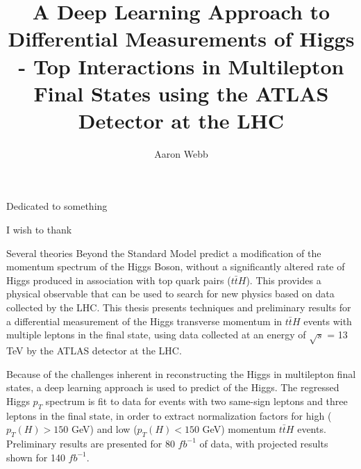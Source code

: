 \documentclass[12pt]{report}	%
\author{Aaron Webb}  	%
\title{A Deep Learning Approach to Differential Measurements of Higgs - Top Interactions in Multilepton Final States using the ATLAS Detector at the LHC}
\theoremstyle{definition}
\theoremstyle{remark}
\begin{document}
\copyrightpage          %


%
%
%
\commcertpage           %

\titlepage              %



%
\begin{dedication}
%
Dedicated to something 
\end{dedication}


\begin{acknowledgments}		%
%
I wish to thank 
\end{acknowledgments}


%
\utabstract
{}%
\indent

\par Several theories Beyond the Standard Model predict a modification of the momentum spectrum of the Higgs Boson, without a significantly altered rate of Higgs produced in association with top quark pairs ($t\bar{t}H$). This provides a physical observable that can be used to search for new physics based on data collected by the LHC. This thesis presents techniques and preliminary results for a differential measurement of the Higgs transverse momentum in $t\bar{t}H$ events with multiple leptons in the final state, using data collected at an energy of $\sqrt{s}$ = 13 TeV by the ATLAS detector at the LHC.

\par Because of the challenges inherent in reconstructing the Higgs in multilepton final states, a deep learning approach is used to predict of the Higgs. The regressed Higgs $p_T$ spectrum is fit to data for events with two same-sign leptons and three leptons in the final state, in order to extract normalization factors for high ($p_{T}(H) > 150$ GeV) and low ($p_{T}(H) < 150$ GeV) momentum $t\bar{t}H$ events. Preliminary results are presented for 80 $fb^{-1}$ of data, with projected results shown for 140 $fb^{-1}$.
\end{document}
